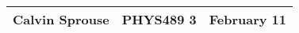 \documentclass[a4paper, 12pt]{config/homework}
\begin{document}
\noindent
\begin{tabularx}{\textwidth}{>{\centering\arraybackslash}X>{\centering\arraybackslash}X>{\centering\arraybackslash}X}
Calvin Sprouse & PHYS489 3 & 2024 February 11\\
\midrule
\end{tabularx}


\end{document}
